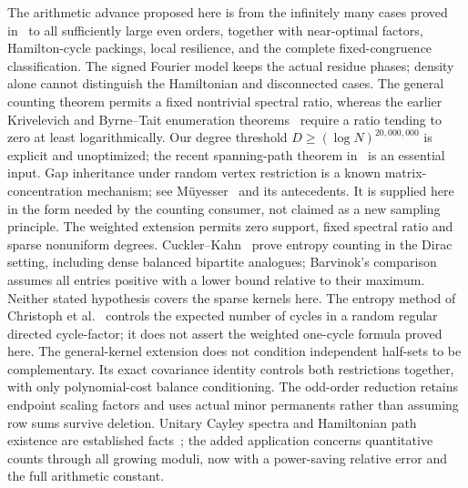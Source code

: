 \documentclass[11pt]{article}
\theoremstyle{remark}
\begin{document}
The arithmetic advance proposed here is from the infinitely
many cases proved in~\cite{CFG} to all sufficiently large even
orders, together with near-optimal factors, Hamilton-cycle
packings, local resilience, and the complete fixed-congruence
classification.
The signed Fourier model keeps the actual residue phases;
density alone cannot distinguish the Hamiltonian and
disconnected cases.
The general counting theorem permits a fixed nontrivial
spectral ratio, whereas the earlier Krivelevich and
Byrne--Tait enumeration theorems~\cite{Krivelevich,BT} require
a ratio tending to zero at least logarithmically.
Our degree threshold \(D\geq(\log N)^{20,000,000}\)
is explicit and unoptimized; the recent spanning-path
theorem in~\cite{BJ} is an essential input.
Gap inheritance under random vertex restriction is a
known matrix-concentration mechanism; see
M\"uyesser~\cite{Muyesser} and its antecedents.
It is supplied here in the form needed by the counting
consumer, not claimed as a new sampling principle.
The weighted extension permits zero support, fixed spectral
ratio and sparse nonuniform degrees.
Cuckler--Kahn~\cite{CK} prove entropy counting in the Dirac
setting, including dense balanced bipartite analogues;
Barvinok's comparison~\cite{Barvinok} assumes all entries
positive with a lower bound relative to their maximum.
Neither stated hypothesis covers the sparse kernels here.
The entropy method of Christoph et al.~\cite{CycleFactors}
controls the expected number of cycles in a random regular
directed cycle-factor; it does not assert the weighted
one-cycle formula proved here.
The general-kernel extension does not condition independent
half-sets to be complementary. Its exact covariance identity
controls both restrictions together, with only polynomial-cost
balance conditioning.
The odd-order reduction retains endpoint scaling factors and
uses actual minor permanents rather than assuming row sums
survive deletion.
Unitary Cayley spectra and Hamiltonian path existence are
established facts~\cite{KS,Basic}; the added application concerns
quantitative counts through all growing moduli, now with a
power-saving relative error and the full arithmetic constant.
\end{document}
